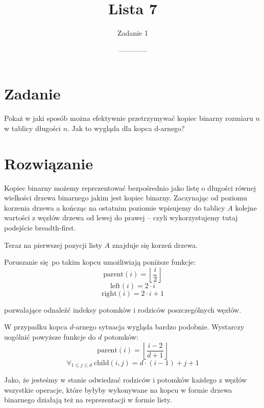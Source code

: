 \documentclass[14pt]{article}
\title{Lista 7}
\author{Zadanie 1}
\date{------------}
\begin{document}
\maketitle

\section{Zadanie}

Pokaż w jaki sposób można efektywnie przetrzymywać kopiec binarny rozmiaru $n$ w tablicy długości $n$. Jak to wygląda dla kopca d-arnego?

\section{Rozwiązanie}

Kopiec binarny możemy reprezentować bezpośrednio jako listę o długości równej wielkości drzewa binarnego jakim jest kopiec binarny. Zaczynając od poziomu korzenia drzewa a kończąc na ostatnim poziomie wpisujemy do tablicy $A$ kolejne wartości z węzłów drzewa od lewej do prawej – czyli wykorzystujemy tutaj podejście breadth-first.

Teraz na pierwszej pozycji listy $A$ znajduje się korzeń drzewa.

Poruszanie się po takim kopcu umożliwiają poniższe funkcje:
$$
\mathrm{parent}(i) = \left\lfloor\frac{i}{2}\right\rfloor
$$
$$
\mathrm{left}(i) = 2\cdot i
$$
$$
\mathrm{right}(i) = 2\cdot i + 1
$$

pozwalające odnaleźć indeksy potomków i rodziców poszczególnych węzłów.

W przypadku kopca $d$-arnego sytuacja wygląda bardzo podobnie. Wystarczy uogólnić powyższe funkcje do $d$ potomków:
$$
\mathrm{parent}(i) = \left\lfloor\frac{i-2}{d+1}\right\rfloor
$$
$$
\forall_{1\le j \le d} ~\mathrm{child}(i, j) = d\cdot (i-1) + j + 1
$$

Jako, że jesteśmy w stanie odwiedzać rodziców i potomków każdego z węzłów wszystkie operacje, które byłyby wykonywane na kopcu w formie drzewa binarnego działają też na reprezentacji w formie listy.
\end{document}
